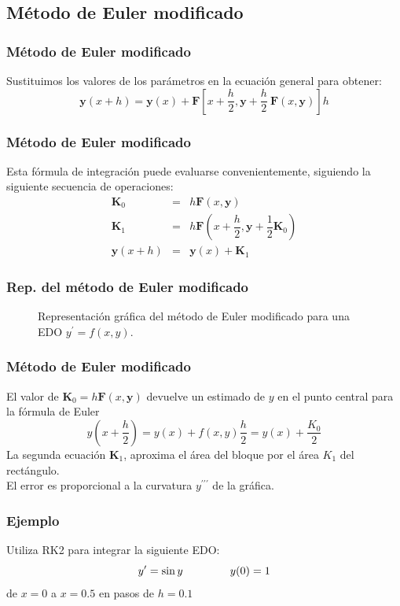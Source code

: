 \subsection{Método de Euler modificado}
\begin{frame}
\frametitle{Método de Euler modificado}
Sustituimos los valores de los parámetros en la ecuación general para obtener:
\begin{equation*}
\mathbf{y}(x + h) = \mathbf{y}(x) + \mathbf{F} \left[  x + \dfrac{h}{2}, \mathbf{y} + \dfrac{h}{2} \: \mathbf{F}(x,\mathbf{y}) \right] h
\end{equation*}
\end{frame}
\begin{frame}
\frametitle{Método de Euler modificado}
Esta fórmula de integración puede evaluarse convenientemente, siguiendo la siguiente secuencia de operaciones:
\begin{eqnarray*}
\mathbf{K}_{0} &=& h \mathbf{F}(x,\mathbf{y}) \\
\mathbf{K}_{1} &=& h \mathbf{F} \left( x+\dfrac{h}{2},\mathbf{y}+\dfrac{1}{2} \mathbf{K}_{0} \right) \\
\mathbf{y}(x+h) &=& \mathbf{y}(x) + \mathbf{K}_{1}
\end{eqnarray*}
\end{frame}
\begin{frame}
\frametitle{Rep. del método de Euler modificado}
\begin{figure}
    \centering
    
    \caption{Representación gráfica del método de Euler modificado para una EDO $y^{\prime}=f(x, y)$.}
\end{figure}
\end{frame}
\begin{frame}
\frametitle{Método de Euler modificado}
El valor de $\mathbf{K}_{0}= h \mathbf{F}(x,\mathbf{y})$ devuelve un estimado de $y$ en el punto central para la fórmula de Euler
\[ y(x+\frac{h}{2}) = y(x) + f(x,y) \frac{h}{2} = y(x) + \frac{K_{0}}{2}\]
La segunda ecuación $\mathbf{K}_{1}$, aproxima el área del bloque por el área $K_{1}$ del rectángulo.
\\
\bigskip
El error es proporcional a la curvatura $y^{\prime \prime \prime}$ de la gráfica.
\end{frame}
\begin{frame}
\frametitle{Ejemplo}
Utiliza RK2 para integrar la siguiente EDO:
\[ y^{\prime} = \sin y \hspace{1.5cm} y(0) = 1\]
de $x = 0$ a $x = 0.5$ en pasos de $h=0.1$
\end{frame}
